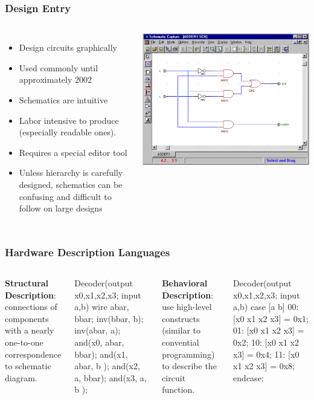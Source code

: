 \documentclass[xcolor=pdflatex,dvipsnames,table]{beamer}
\begin{document}
\begin{frame}
\frametitle{Design Entry}
\begin{columns}[c]
\begin{itemize}
\item Design circuits graphically
\item Used commonly until approximately 2002
\item Schematics are intuitive
\item Labor intensive to produce (especially readable ones).
\item Requires a special editor tool
\item Unless hierarchy is carefully designed, schematics can be confusing and difficult to follow on large designs
\end{itemize}
\begin{center}
\includegraphics[height=0.4\textheight]{figs/schematic-capture.pdf}
\end{center}
\end{columns}
\end{frame}

\begin{frame}[fragile]
\frametitle{Hardware Description Languages}
\begin{columns}[c]
\textbf{Structural Description}: connections of components with a nearly one-to-one correspondence to schematic diagram.
\begin{scala}
Decoder(output x0,x1,x2,x3; 
        input a,b) {
  wire abar, bbar;
  inv(bbar, b);
  inv(abar, a);
  and(x0, abar, bbar);
  and(x1, abar, b   );
  and(x2, a,    bbar);
  and(x3, a,    b   );
} 
\end{scala}
\textbf{Behavioral Description}: use high-level constructs (similar to convential programming) to describe the circuit function.
\begin{scala}
Decoder(output x0,x1,x2,x3; 
        input a,b) {
  case [a b]
    00: [x0 x1 x2 x3] = 0x1;
    01: [x0 x1 x2 x3] = 0x2;
    10: [x0 x1 x2 x3] = 0x4;
    11: [x0 x1 x2 x3] = 0x8;
  endcase;
}
\end{scala}
\end{columns}
\end{frame}
\end{document}
